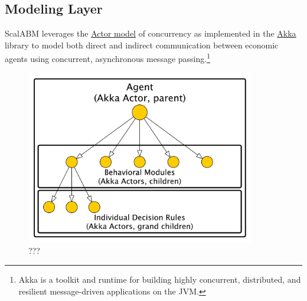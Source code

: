 \documentclass[11pt]{amsart}
\begin{document}
\subsection{Modeling Layer}
ScalABM leverages the \href{https://en.wikipedia.org/wiki/Actor_model}{Actor model} of concurrency as implemented in the \href{http://akka.io/}{Akka} library to model both direct and indirect communication between economic agents using concurrent, asynchronous message passing.\footnote{
%
Akka is a toolkit and runtime for building highly concurrent, distributed, and resilient message-driven applications on the JVM.
%
}
\begin{figure}[H]
\centering
\includegraphics[width=10cm]{img/hierarchical-actor-2.pdf}
\caption{???}
\end{figure}
\end{document}
